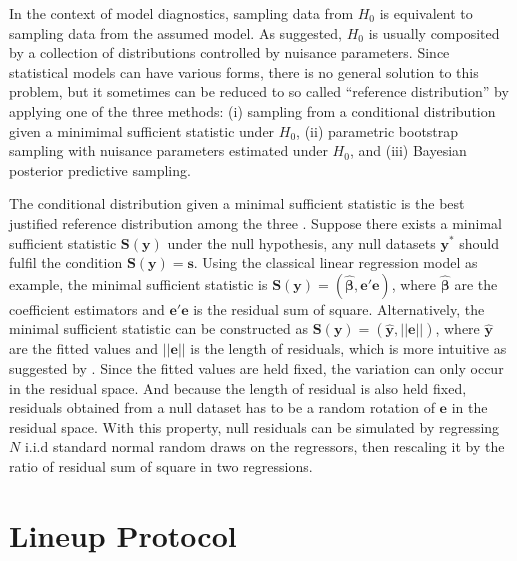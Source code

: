\documentclass{monashthesis}
\theoremstyle{definition}
\theoremstyle{definition}
\theoremstyle{definition}
\theoremstyle{definition}
\theoremstyle{remark}
\begin{document}
In the context of model diagnostics, sampling data from \(H_0\) is equivalent to sampling data from the assumed model. As \textcite{buja_statistical_2009} suggested, \(H_0\) is usually composited by a collection of distributions controlled by nuisance parameters. Since statistical models can have various forms, there is no general solution to this problem, but it sometimes can be reduced to so called ``reference distribution'' by applying one of the three methods: (i) sampling from a conditional distribution given a minimimal sufficient statistic under \(H_0\), (ii) parametric bootstrap sampling with nuisance parameters estimated under \(H_0\), and (iii) Bayesian posterior predictive sampling.

The conditional distribution given a minimal sufficient statistic is the best justified reference distribution among the three \autocite{buja_statistical_2009}. Suppose there exists a minimal sufficient statistic \(\boldsymbol{S}(\boldsymbol{y})\) under the null hypothesis, any null datasets \(\boldsymbol{y^{*}}\) should fulfil the condition \(\boldsymbol{S}(\boldsymbol{y}) = \boldsymbol{s}\). Using the classical linear regression model as example, the minimal sufficient statistic is \(\boldsymbol{S}(\boldsymbol{y}) = (\hat{\boldsymbol{\beta}}, \boldsymbol{e}'\boldsymbol{e})\), where \(\hat{\boldsymbol{\beta}}\) are the coefficient estimators and \(\boldsymbol{e}'\boldsymbol{e}\) is the residual sum of square. Alternatively, the minimal sufficient statistic can be constructed as \(\boldsymbol{S}(\boldsymbol{y}) = (\hat{\boldsymbol{y}}, ||\boldsymbol{e}||)\), where \(\hat{\boldsymbol{y}}\) are the fitted values and \(||\boldsymbol{e}||\) is the length of residuals, which is more intuitive as suggested by \textcite{buja_statistical_2009}. Since the fitted values are held fixed, the variation can only occur in the residual space. And because the length of residual is also held fixed, residuals obtained from a null dataset has to be a random rotation of \(\boldsymbol{e}\) in the residual space. With this property, null residuals can be simulated by regressing \(N\) i.i.d standard normal random draws on the regressors, then rescaling it by the ratio of residual sum of square in two regressions.

\hypertarget{se:lineup}{%
\section{Lineup Protocol}\label{se:lineup}}
\end{document}
